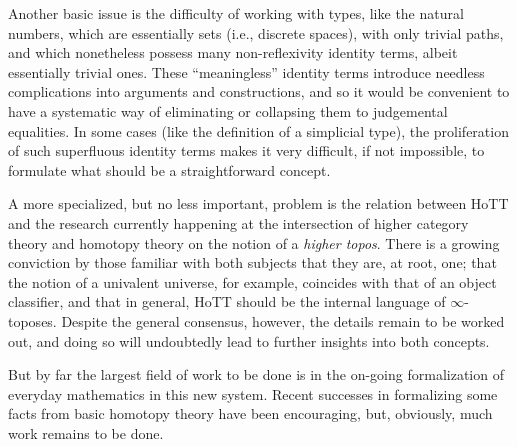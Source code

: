 {Another basic issue is the difficulty of working with types, like the natural numbers, which are essentially sets (i.e., discrete spaces), with only trivial paths, and which nonetheless possess many non-reflexivity identity terms, albeit essentially trivial ones.  These ``meaningless'' identity terms introduce needless complications into arguments and constructions, and so it would be convenient to have a systematic way of eliminating or collapsing them to judgemental equalities.  In some cases (like the definition of a simplicial type), the proliferation of such superfluous identity terms makes it very difficult, if not impossible, to formulate what should be a straightforward concept.

A more specialized, but no less important, problem is the relation between HoTT and the research currently happening at the intersection of higher category theory and homotopy theory on the notion of a \emph{higher topos}.  There is a growing conviction by those familiar with both subjects that they are, at root, one; that the notion of a univalent universe, for example, coincides with that of an object classifier, and that in general, HoTT should be the internal language of $\infty$-toposes.  Despite the general consensus, however, the details remain to be worked out, and doing so will undoubtedly lead to further insights into both concepts.

But by far the largest field of work to be done is in the on-going formalization of everyday mathematics in this new system.  Recent successes in formalizing some facts from basic homotopy theory have been encouraging, but, obviously, much work remains to be done.

%

}%

